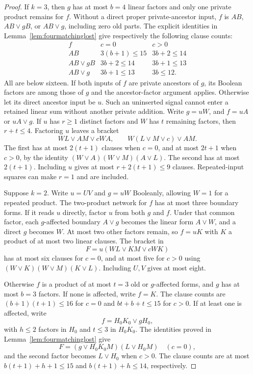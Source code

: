 \documentclass[11pt]{article}
\theoremstyle{definition}
\theoremstyle{remark}
\begin{document}
\begin{proof}
If $k=3$, then $g$ has at most $b=4$ linear factors and only one private product remains for $f$. Without a direct proper private-ancestor input, $f$ is $AB$, $AB\vee gB$, or $AB\vee g$, including zero old parts. The explicit identities in Lemma~\ref{lem:fourmatchinglost} give respectively the following clause counts:
\[
\begin{array}{c|cc}
 f&c=0&c>0\\ \hline
 AB&3(b+1)\le15&3b+2\le14\\
 AB\vee gB&3b+2\le14&3b+1\le13\\
 AB\vee g&3b+1\le13&3b\le12.
\end{array}
\]
All are below sixteen. If both inputs of $f$ are private ancestors of $g$, its Boolean factors are among those of $g$ and the ancestor-factor argument applies. Otherwise let its direct ancestor input be $u$. Such an uninserted signal cannot enter a retained linear sum without another private addition. Write $g=uW$, and $f=uA$ or $uA\vee g$. If $u$ has $r\ge1$ distinct factors and $W$ has $t$ remaining factors, then $r+t\le4$. Factoring $u$ leaves a bracket
\[
 WL\vee AM\vee cWA,
 \qquad W(L\vee M\vee c)\vee AM.
\]
The first has at most $2(t+1)$ clauses when $c=0$, and at most $2t+1$ when $c>0$, by the identity $(W\vee A)(W\vee M)(A\vee L)$. The second has at most $2(t+1)$. Including $u$ gives at most $r+2(t+1)\le9$ clauses. Repeated-input squares can make $r=1$ and are included.

Suppose $k=2$. Write $u=UV$ and $g=uW$ Booleanly, allowing $W=1$ for a repeated product. The two-product network for $f$ has at most three boundary forms. If it reads $u$ directly, factor $u$ from both $g$ and $f$. Under that common factor, each $g$-affected boundary $A\vee g$ becomes the linear form $A\vee W$, and a direct $g$ becomes $W$. At most two other factors remain, so $f=uK$ with $K$ a product of at most two linear clauses. The bracket in
\[
 F=u(WL\vee KM\vee cWK)
\]
has at most six clauses for $c=0$, and at most five for $c>0$ using $(W\vee K)(W\vee M)(K\vee L)$. Including $U,V$ gives at most eight.

Otherwise $f$ is a product of at most $t=3$ old or $g$-affected forms, and $g$ has at most $b=3$ factors. If none is affected, write $f=K$. The clause counts are $(b+1)(t+1)\le16$ for $c=0$ and $bt+b+t\le15$ for $c>0$. If at least one is affected, write
\[
 f=H_0K_0\vee gH_0,
\]
with $h\le2$ factors in $H_0$ and $t\le3$ in $H_0K_0$. The identities proved in Lemma~\ref{lem:fourmatchinglost} give
\[
 F=(g\vee H_0K_0M)(L\vee H_0M)\quad(c=0),
\]
and the second factor becomes $L\vee H_0$ when $c>0$. The clause counts are at most $b(t+1)+h+1\le15$ and $b(t+1)+h\le14$, respectively.


\end{proof}
\end{document}
